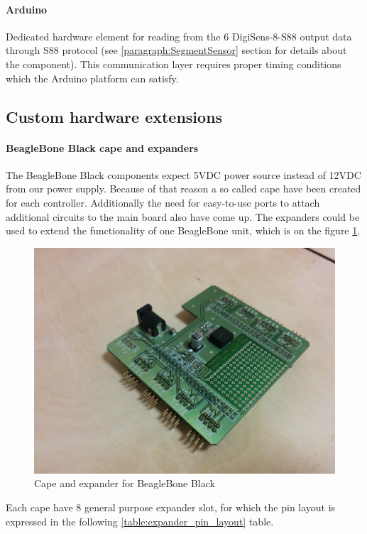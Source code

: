 \paragraph{Arduino}
Dedicated hardware element for reading from the 6 DigiSens-8-S88 output data through S88 protocol (see \ref{paragraph:SegmentSensor} section for details about the component). This communication layer requires proper timing conditions which the Arduino platform can satisfy.
\subsection{Custom hardware extensions}
\paragraph{BeagleBone Black cape and expanders}\label{paragraph:BBBcape}
The BeagleBone Black components expect 5VDC power source instead of 12VDC from our power supply. Because of that reason a so called cape have been created for each controller. Additionally the need for easy-to-use ports to attach additional circuits to the main board also have come up. The expanders could be used to extend the functionality of one BeagleBone unit, which is on the figure \ref{fig:cape}.
\begin{figure}[!ht]
	\centering
	\includegraphics[width=150mm]{figures/modes3/cap1.jpg}
	\caption{Cape and expander for BeagleBone Black}
	\label{fig:cape}
\end{figure}

Each cape have 8 general purpose expander slot, for which the pin layout is expressed in the following \ref{table:expander_pin_layout} table.

